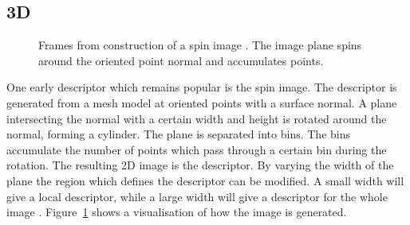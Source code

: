\documentclass[11pt,a4paper]{kth-mag}
\begin{document}
\subsection{3D}
\begin{figure}
  \centering
  \caption{Frames from construction of a spin image \cite{johnson1997spin}. The
    image plane spins around the oriented point normal and accumulates points.}
  \label{fig:spinimg}
\end{figure}

One early descriptor which remains popular is the spin image. The descriptor is
generated from a mesh model at oriented points with a surface normal. A plane
intersecting the normal with a certain width and height is rotated around the
normal, forming a cylinder. The plane is separated into bins. The bins
accumulate the number of points which pass through a certain bin during the
rotation. The resulting 2D image is the descriptor. By varying the width of the
plane the region which defines the descriptor can be modified. A small width
will give a local descriptor, while a large width will give a descriptor for the
whole image \cite{johnson1997spin,johnson1999using}. Figure~\ref{fig:spinimg}
shows a visualisation of how the image is generated.
\end{document}
